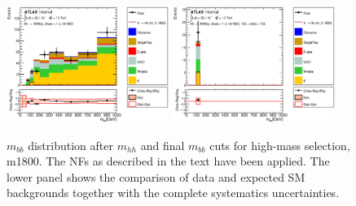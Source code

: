 \begin{figure}
\begin{center}
\includegraphics*[width=0.47\textwidth] {figures/Unblinded_mbb/C_reOpt2000_bbpt350_wwpt250_drww15_hh1800_bbMass_regionA_met25d020.eps}
\includegraphics*[width=0.47\textwidth] {figures/Unblinded_mbb/C_reOpt2000_bbpt350_wwpt250_drww15_hh1800_mbb_bbMass_regionA_met25d020.eps}
\caption[$m_{bb}$ distribution after $m_{hh}$ and final $m_{bb}$ cuts for high-mass selection, m1800.]{$m_{bb}$ distribution after $m_{hh}$ and final $m_{bb}$ cuts for high-mass selection, m1800. The NFs as described in the text have been applied. The lower panel shows the comparison of data and expected SM backgrounds together with the complete systematics uncertainties.}
\end{center}
\end{figure}

